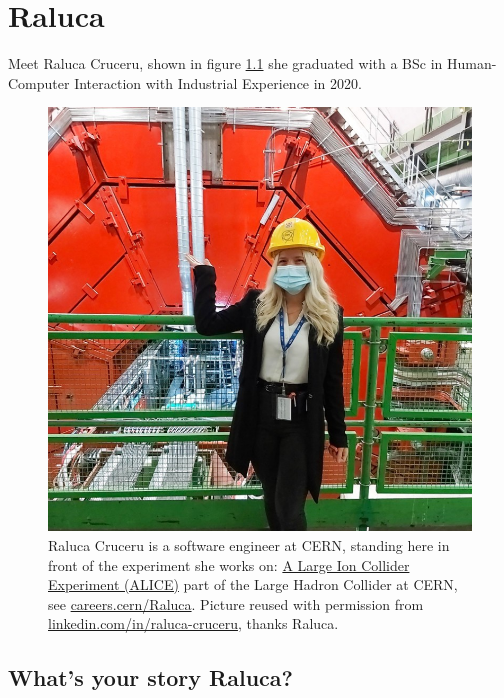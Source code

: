 \documentclass[
]{book}
\begin{document}
\hypertarget{raluca}{%
\chapter{Raluca}\label{raluca}}

Meet Raluca Cruceru, shown in figure \ref{fig:raluca-fig} she graduated with a BSc in Human-Computer Interaction with Industrial Experience in 2020.

\begin{figure}

{\centering \includegraphics[width=1\linewidth]{images/raluca} 

}

\caption{Raluca Cruceru is a software engineer at CERN, standing here in front of the experiment she works on: \href{https://en.wikipedia.org/wiki/ALICE_experiment}{A Large Ion Collider Experiment (ALICE)} part of the Large Hadron Collider at CERN, see \href{https://careers.cern/Raluca}{careers.cern/Raluca}. Picture reused with permission from \href{https://www.linkedin.com/in/raluca-cruceru/}{linkedin.com/in/raluca-cruceru}, thanks Raluca.}\label{fig:raluca-fig}
\end{figure}



\hypertarget{ralucastory}{%
\section{What's your story Raluca?}\label{ralucastory}}
\end{document}

